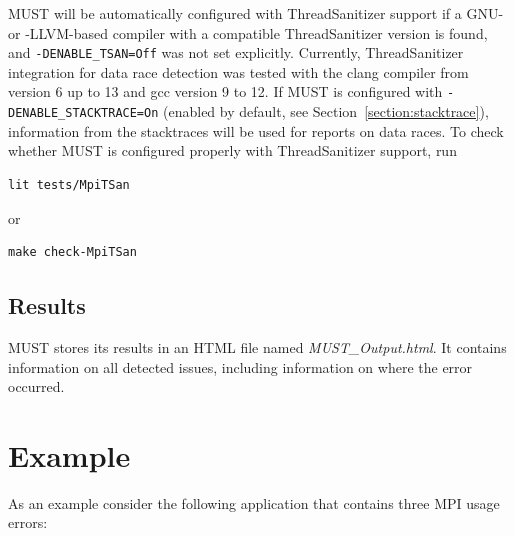 \documentclass[english]{scrartcl}
\begin{document}
MUST will be automatically configured with ThreadSanitizer support if a GNU- or -LLVM-based compiler with a compatible ThreadSanitizer version is found, and \verb|-DENABLE_TSAN=Off| was not set explicitly.
Currently, ThreadSanitizer integration for data race detection was tested with the clang compiler from version 6 up to 13 and gcc version 9 to 12.
If MUST is configured with \verb|-DENABLE_STACKTRACE=On| (enabled by default, see Section~\ref{section:stacktrace}), information from the stacktraces will be used for reports on data races.
To check whether MUST is configured properly with ThreadSanitizer support, run
\begin{verbatim}
lit tests/MpiTSan
\end{verbatim}
or
\begin{verbatim}
make check-MpiTSan
\end{verbatim}

\subsection{Results}
MUST stores its results in an HTML file named \emph{MUST\_Output.html}. It
contains information on all detected issues, including information on where the
error occurred.

\section{Example}
As an example consider the following application that contains three MPI usage
errors:
\end{document}
